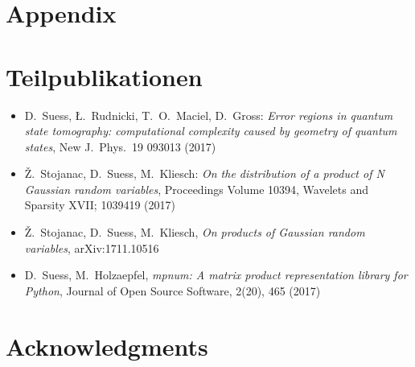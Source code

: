 \documentclass[
  a4paper,
  11pt,
  BCOR=8mm,
  twoside,
  headsepline]{scrbook}
\begin{document}
\pagestyle{useheadings}
\tableofcontents

\mainmatter










\appendix

\chapter{Appendix}%





\printbibliography[heading=bibintoc]

\clearpage
\chapter*{Teilpublikationen}
\pagestyle{empty}
\begin{itemize}
  \item D.\ Suess, Ł.\ Rudnicki, T.\ O.\ Maciel, D.\ Gross: \textit{Error regions in quantum state tomography: computational complexity caused by geometry of quantum states}, New J.\ Phys.\ 19 093013 (2017)
  \item Ž.\ Stojanac, D.\ Suess, M.\ Kliesch: \textit{On the distribution of a product of N Gaussian random variables}, Proceedings Volume 10394, Wavelets and Sparsity XVII; 1039419 (2017)
  \item Ž.\ Stojanac, D.\ Suess, M.\ Kliesch, \textit{On products of Gaussian random variables}, arXiv:1711.10516
  \item D.\ Suess, M.\ Holzaepfel, \textit{mpnum: A matrix product representation library for Python}, Journal of Open Source Software, 2(20), 465 (2017)
\end{itemize}
\clearpage
\chapter*{Acknowledgments}
\pagestyle{empty}
\end{document}
